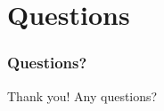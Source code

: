 \section{Questions}
\begin{frame}
   \frametitle{Questions?}
   Thank you!\newline	
   Any questions?
\end{frame}
